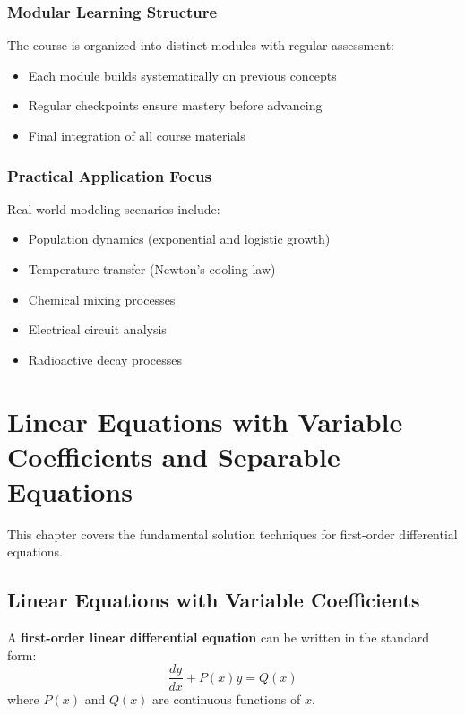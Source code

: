 \documentclass[12pt, letterpaper]{book}
\theoremstyle{problemstyle}
\theoremstyle{solutionstyle}
\begin{document}
\subsection{Modular Learning Structure}
The course is organized into distinct modules with regular assessment:
\begin{itemize}
    \item Each module builds systematically on previous concepts
    \item Regular checkpoints ensure mastery before advancing
    \item Final integration of all course materials
\end{itemize}

\subsection{Practical Application Focus}
Real-world modeling scenarios include:
\begin{itemize}
    \item Population dynamics (exponential and logistic growth)
    \item Temperature transfer (Newton's cooling law)
    \item Chemical mixing processes
    \item Electrical circuit analysis
    \item Radioactive decay processes
\end{itemize}

\chapter{Linear Equations with Variable Coefficients and Separable Equations}
\label{chap:session_2}

This chapter covers the fundamental solution techniques for first-order differential equations.

\section{Linear Equations with Variable Coefficients}
A \textbf{first-order linear differential equation} can be written in the standard form:
\begin{equation*}
    \frac{dy}{dx} + P(x)y = Q(x)
\end{equation*}
where $P(x)$ and $Q(x)$ are continuous functions of $x$.
\end{document}
